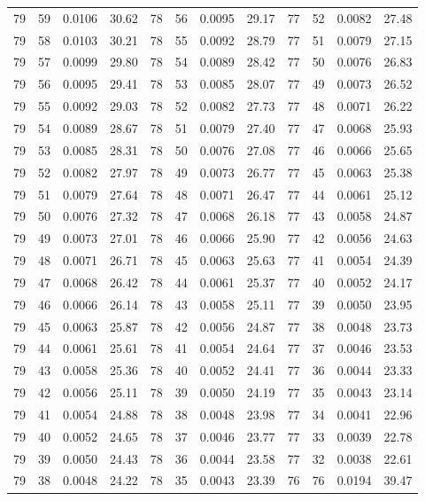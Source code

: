 \begin{tabular}{llll|llll|llll}
79 & 59 & 0.0106 & 30.62 & 78 & 56 & 0.0095 & 29.17 & 77 & 52 & 0.0082 & 27.48\\
79 & 58 & 0.0103 & 30.21 & 78 & 55 & 0.0092 & 28.79 & 77 & 51 & 0.0079 & 27.15\\
79 & 57 & 0.0099 & 29.80 & 78 & 54 & 0.0089 & 28.42 & 77 & 50 & 0.0076 & 26.83\\
79 & 56 & 0.0095 & 29.41 & 78 & 53 & 0.0085 & 28.07 & 77 & 49 & 0.0073 & 26.52\\
79 & 55 & 0.0092 & 29.03 & 78 & 52 & 0.0082 & 27.73 & 77 & 48 & 0.0071 & 26.22\\
79 & 54 & 0.0089 & 28.67 & 78 & 51 & 0.0079 & 27.40 & 77 & 47 & 0.0068 & 25.93\\
79 & 53 & 0.0085 & 28.31 & 78 & 50 & 0.0076 & 27.08 & 77 & 46 & 0.0066 & 25.65\\
79 & 52 & 0.0082 & 27.97 & 78 & 49 & 0.0073 & 26.77 & 77 & 45 & 0.0063 & 25.38\\
79 & 51 & 0.0079 & 27.64 & 78 & 48 & 0.0071 & 26.47 & 77 & 44 & 0.0061 & 25.12\\
79 & 50 & 0.0076 & 27.32 & 78 & 47 & 0.0068 & 26.18 & 77 & 43 & 0.0058 & 24.87\\
79 & 49 & 0.0073 & 27.01 & 78 & 46 & 0.0066 & 25.90 & 77 & 42 & 0.0056 & 24.63\\
79 & 48 & 0.0071 & 26.71 & 78 & 45 & 0.0063 & 25.63 & 77 & 41 & 0.0054 & 24.39\\
79 & 47 & 0.0068 & 26.42 & 78 & 44 & 0.0061 & 25.37 & 77 & 40 & 0.0052 & 24.17\\
79 & 46 & 0.0066 & 26.14 & 78 & 43 & 0.0058 & 25.11 & 77 & 39 & 0.0050 & 23.95\\
79 & 45 & 0.0063 & 25.87 & 78 & 42 & 0.0056 & 24.87 & 77 & 38 & 0.0048 & 23.73\\
79 & 44 & 0.0061 & 25.61 & 78 & 41 & 0.0054 & 24.64 & 77 & 37 & 0.0046 & 23.53\\
79 & 43 & 0.0058 & 25.36 & 78 & 40 & 0.0052 & 24.41 & 77 & 36 & 0.0044 & 23.33\\
79 & 42 & 0.0056 & 25.11 & 78 & 39 & 0.0050 & 24.19 & 77 & 35 & 0.0043 & 23.14\\
79 & 41 & 0.0054 & 24.88 & 78 & 38 & 0.0048 & 23.98 & 77 & 34 & 0.0041 & 22.96\\
79 & 40 & 0.0052 & 24.65 & 78 & 37 & 0.0046 & 23.77 & 77 & 33 & 0.0039 & 22.78\\
79 & 39 & 0.0050 & 24.43 & 78 & 36 & 0.0044 & 23.58 & 77 & 32 & 0.0038 & 22.61\\
79 & 38 & 0.0048 & 24.22 & 78 & 35 & 0.0043 & 23.39 & 76 & 76 & 0.0194 & 39.47\\

\end{tabular}
